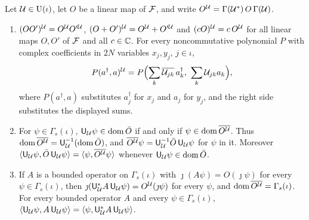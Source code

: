 \begin{vetdenv}
\begin{theorem}\label{thm:sq-conj}
Let $\mathcal U\in\mathrm U(\iota)$, let $O$ be a linear map of $\mathcal F$, and write $O^\mathcal U=\Gamma(\mathcal U^*)\,O\,\Gamma(\mathcal U)$.
\begin{enumerate}
\item[(a)] $(OO')^\cU=O^\cU O'^\cU$, $(O+O')^\cU=O^\cU+O'^\cU$ and $(cO)^\mathcal U=c\,O^\mathcal U$ for all linear maps $O,O'$ of
$\mathcal F$ and all $c\in\mathbb C$. For every noncommutative polynomial $P$ with complex coefficients in $2N$ variables
$x_j,y_j$, $j\in\iota$,
\[
 P(a^\dagger,a)^\cU=P\Bigl(\sum_k\overline{\cU_{jk}}\,a_k^\dagger,\ \sum_k\cU_{jk}a_k\Bigr),
\]
where $P(a^\dagger,a)$ substitutes $a_j^\dagger$ for $x_j$ and $a_j$ for $y_j$, and the right side substitutes the
displayed sums.
\item[(b)] For $\psi\in\Gamma_s(\iota)$, $\mathsf U_\mathcal U\psi\in\operatorname{dom}\bar O$ if and only if $\psi\in\operatorname{dom}\overline{O^\mathcal U}$. Thus
$\operatorname{dom}\overline{O^\mathcal U}=\mathsf U_\mathcal U^{-1}(\operatorname{dom}\bar O)$, and $\overline{O^\mathcal U}\psi=\mathsf U_\mathcal U^{-1}\bar O\,\mathsf U_\mathcal U\psi$ for $\psi$ in it.
Moreover $\langle\mathsf U_\mathcal U\psi,\bar O\,\mathsf U_\mathcal U\psi\rangle=\langle\psi,\overline{O^\mathcal U}\psi\rangle$ whenever
$\mathsf U_\mathcal U\psi\in\operatorname{dom}\bar O$.
\item[(c)] If $A$ is a bounded operator on $\Gamma_s(\iota)$ with $\jmath(A\psi)=O(\jmath\psi)$ for every
$\psi\in\Gamma_s(\iota)$, then $\jmath(\mathsf U_\mathcal U^*A\,\mathsf U_\mathcal U\psi)=O^\mathcal U(\jmath\psi)$ for every $\psi$, and
$\operatorname{dom}\overline{O^\mathcal U}=\Gamma_s(\iota)$. For every bounded operator $A$ and every $\psi\in\Gamma_s(\iota)$,
$\langle\mathsf U_\mathcal U\psi,A\,\mathsf U_\mathcal U\psi\rangle=\langle\psi,\mathsf U_\mathcal U^*A\,\mathsf U_\mathcal U\psi\rangle$.
\end{enumerate}
\end{theorem}


\end{vetdenv}
